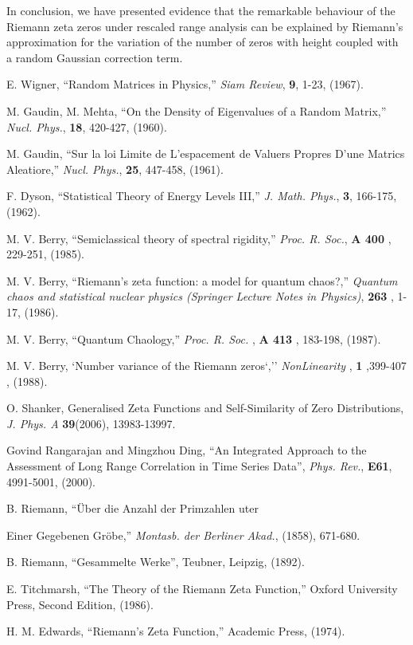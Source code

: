 \documentclass[11pt]{article}
\begin{document}
In conclusion, we have presented evidence that the remarkable
behaviour of the Riemann zeta zeros under rescaled range analysis
can be explained by Riemann's approximation
for the variation of the number of zeros with height coupled with a
random Gaussian correction term.





\begin{footnotesize}
\begin{thebibliography}{10}

 E. Wigner, ``Random Matrices in Physics,'' {\it Siam
Review}, {\bf 9}, 1-23, (1967).

 M. Gaudin, M. Mehta, ``On the Density of Eigenvalues of a
Random Matrix,'' {\it Nucl. Phys.}, {\bf 18}, 420-427, (1960).

 M. Gaudin, ``Sur la loi Limite de L'espacement de Valuers
Propres D'une Matrics Aleatiore,'' {\it Nucl. Phys.}, {\bf 25}, 447-458,
(1961).

 F. Dyson, ``Statistical Theory of Energy Levels III,''
{\it J. Math. Phys.}, {\bf 3}, 166-175, (1962).

 M. V. Berry,
``Semiclassical theory of spectral rigidity,''
{\it Proc. R. Soc.}, {\bf A 400 }, 229-251, (1985).


 M. V. Berry,
``Riemann's zeta function: a model for quantum chaos?,''
{\it Quantum chaos and statistical nuclear physics
(Springer Lecture Notes in Physics)}, {\bf 263 }, 1-17, (1986).


 M. V. Berry, ``Quantum Chaology,''
{\it Proc. R. Soc. }, {\bf A 413 }, 183-198, (1987).


 M. V. Berry, `Number variance of the Riemann zeros`,''
{\it NonLinearity }, {\bf 1 },399-407 , (1988).


 O. Shanker,
Generalised Zeta Functions and Self-Similarity of Zero Distributions,
{\it J.  Phys. A} {\bf39}(2006), 13983-13997.

Govind Rangarajan and Mingzhou Ding,
\newblock ``An Integrated Approach to the Assessment of Long Range
Correlation in Time Series Data'',
{\it Phys. Rev.}, {\bf E61}, 4991-5001, (2000).

 B. Riemann, ``\"{U}ber die Anzahl der Primzahlen uter

Einer Gegebenen Gr\"{o}be,'' {\it Montasb. der Berliner Akad.}, (1858),
671-680.

 B. Riemann, ``Gesammelte Werke'', Teubner, Leipzig, (1892).

 E. Titchmarsh, ``The Theory of the Riemann Zeta
Function,'' Oxford University Press, Second Edition, (1986).

 H. M. Edwards, ``Riemann's Zeta Function,''
Academic Press,  (1974).

\end{thebibliography}
\end{footnotesize}
\end{document}
